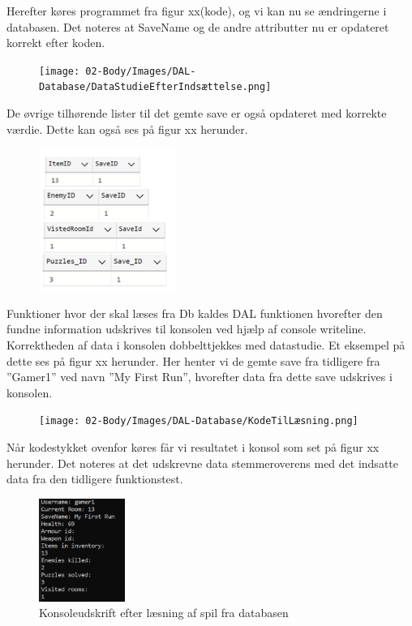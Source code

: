 Herefter køres programmet fra figur xx(kode), og vi kan nu se ændringerne i databasen.
Det noteres at SaveName og de andre attributter nu er opdateret korrekt efter koden.

\begin{figure}[H]
\centering
\texttt{[image: 02-Body/Images/DAL-Database/DataStudieEfterIndsættelse.png]}
\caption{}
\label{fig:}
\end{figure}

De øvrige tilhørende lister til det gemte save er også opdateret med korrekte værdie. Dette kan også ses på figur xx herunder.

\begin{figure}[H]
\centering
\includegraphics[width = 0.4\textwidth]{02-Body/Images/DAL-Database/Lister.png}
\caption{}
\label{fig:}
\end{figure}

Funktioner hvor der skal læses fra Db kaldes DAL funktionen hvorefter den fundne information udskrives til konsolen ved hjælp af console writeline. Korrektheden af data i konsolen dobbelttjekkes med datastudie.
Et eksempel på dette ses på figur xx herunder.
Her henter vi de gemte save fra tidligere fra ”Gamer1” ved navn ”My First Run”, hvorefter data fra dette save udskrives i konsolen.

\begin{figure}[H]
\centering
\texttt{[image: 02-Body/Images/DAL-Database/KodeTilLæsning.png]}
\caption{}
\label{fig:KodeTilLæsningAfSave}
\end{figure}

Når kodestykket ovenfor køres får vi resultatet i konsol som set på figur xx herunder.
Det noteres at det udskrevne data stemmeroverens med det indsatte data fra den tidligere funktionstest.

\begin{figure}[H]
\centering
\includegraphics[width = 0.25\textwidth]{02-Body/Images/DAL-Database/ConsoleOutput.png}
\caption{Konsoleudskrift efter læsning af spil fra databasen}
\label{fig:Modulttest-consoleOutput}
\end{figure}


